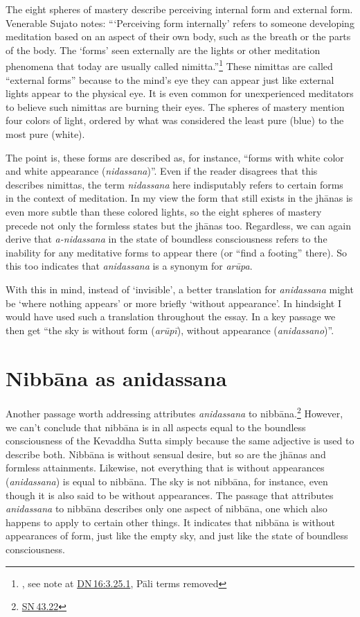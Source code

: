 \documentclass[10pt, openany]{book}
\begin{document}
The eight spheres of mastery describe perceiving internal form and external form. Venerable Sujato notes: “‘Perceiving form internally’ refers to someone developing meditation based on an aspect of their own body, such as the breath or the parts of the body. The ‘forms’ seen externally are the lights or other meditation phenomena that today are usually called nimitta.”\footnote {\cite{Sujato 2018}, see note at \href{https://suttacentral.net/dn16/en/sujato\#3.25.1}{DN 16:3.25.1}, Pāli terms removed} These nimittas are called “external forms” because to the mind’s eye they can appear just like external lights appear to the physical eye. It is even common for unexperienced meditators to believe such nimittas are burning their eyes. The spheres of mastery mention four colors of light, ordered by what was considered the least pure (blue) to the most pure (white).


The point is, these forms are described as, for instance, “forms with white color and white appearance (\textit{nidassana})”. Even if the reader disagrees that this describes nimittas, the term \textit{nidassana} here indisputably refers to certain forms in the context of meditation. In my view the form that still exists in the jhānas is even more subtle than these colored lights, so the eight spheres of mastery precede not only the formless states but the jhānas too. Regardless, we can again derive that \textit{a-nidassana} in the state of boundless consciousness refers to the inability for any meditative forms to appear there (or “find a footing” there). So this too indicates that \textit{anidassana} is a synonym for \textit{arūpa}.


With this in mind, instead of ‘invisible’, a better translation for \textit{anidassana} might be ‘where nothing appears’ or more briefly ‘without appearance’. In hindsight I would have used such a translation throughout the essay. In a key passage we then get “the sky is without form (\textit{arūpī}), without appearance (\textit{anidassano})”.




\section{Nibbāna as anidassana}
Another passage worth addressing attributes \textit{anidassana} to nibbāna.\footnote {\href{https://suttacentral.net/sn43.22/en/sujato}{SN 43.22}} However, we can’t conclude that nibbāna is in all aspects equal to the boundless consciousness of the Kevaddha Sutta simply because the same adjective is used to describe both. Nibbāna is without sensual desire, but so are the jhānas and formless attainments. Likewise, not everything that is without appearances (\textit{anidassana}) is equal to nibbāna. The sky is not nibbāna, for instance, even though it is also said to be without appearances. The passage that attributes \textit{anidassana} to nibbāna describes only one aspect of nibbāna, one which also happens to apply to certain other things. It indicates that nibbāna is without appearances of form, just like the empty sky, and just like the state of boundless consciousness.
\end{document}
